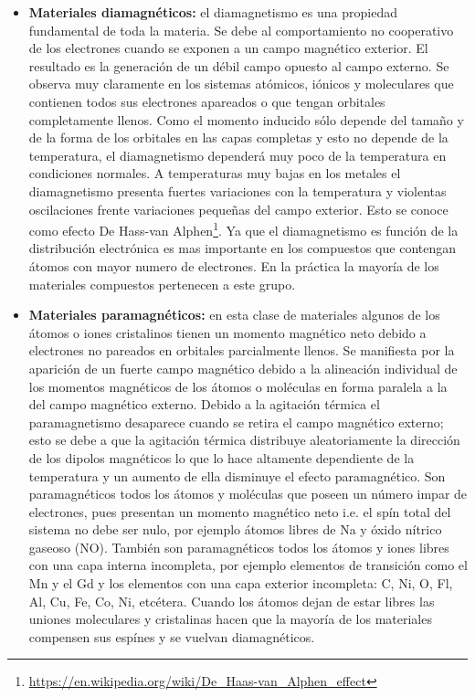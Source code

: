 \begin{itemize}

	\item \textbf{Materiales diamagnéticos:}
el diamagnetismo es una propiedad fundamental de toda la materia. Se debe al comportamiento no cooperativo de los electrones cuando se exponen a un campo magnético exterior. El resultado es la generación de un débil campo opuesto al campo externo. Se observa muy claramente en los sistemas atómicos, iónicos y moleculares que contienen todos sus electrones apareados o que tengan orbitales completamente llenos. Como el momento inducido sólo depende del tamaño y de la forma de los orbitales en las capas completas y esto no depende de la temperatura, el diamagnetismo dependerá muy poco de la temperatura en condiciones normales. A temperaturas muy bajas en los metales el diamagnetismo presenta fuertes variaciones con la temperatura y violentas oscilaciones frente variaciones pequeñas del campo exterior. Esto se conoce como efecto De Hass-van Alphen\footnote{\url{https://en.wikipedia.org/wiki/De\_Haas-van\_Alphen\_effect}}. Ya que el diamagnetismo es función de la distribución electrónica es mas importante en los compuestos que contengan átomos con mayor numero de electrones.
En la práctica la mayoría de los materiales compuestos pertenecen a este grupo.

	\item \textbf{Materiales paramagnéticos:} 
en esta clase de materiales algunos de los átomos o iones cristalinos tienen un momento magnético neto debido a electrones no pareados en orbitales parcialmente llenos. Se manifiesta por la aparición de un fuerte campo magnético debido a la alineación individual de los momentos magnéticos de los átomos o moléculas en forma paralela a la del campo magnético externo. Debido a la agitación térmica el paramagnetismo desaparece  cuando se retira el campo magnético externo; esto se debe a que la agitación térmica distribuye aleatoriamente la dirección de los dipolos magnéticos lo que lo hace altamente dependiente de la temperatura y un aumento de ella disminuye el efecto paramagnético. Son paramagnéticos todos los átomos y moléculas que poseen un número impar de electrones, pues presentan un momento magnético neto i.e. el spín total del sistema no debe ser nulo, por ejemplo átomos libres de Na y óxido nítrico gaseoso (NO). También son paramagnéticos todos los átomos y iones libres con una capa interna incompleta, por ejemplo elementos de transición como el Mn y el Gd y los elementos con una capa exterior incompleta: C, Ni, O, Fl, Al, Cu, Fe, Co, Ni, etcétera. Cuando los átomos dejan de estar libres las uniones moleculares y cristalinas hacen que la mayoría de los materiales compensen sus espínes y se vuelvan diamagnéticos. 

\end{itemize}


